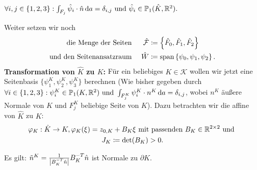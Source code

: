 \begin{remark}
 	$\forall i,j\in\{1,2,3\}: \int_{F_j} \hat{\psi}_i \cdot \hat{n} \mathop{}\!\mathrm{d} a = \delta_{i,j} \text{ und } \hat{\psi}_i \in \mathbb{P}_1(\hat{K}, \mathbb{R}^2).$
\end{remark}

Weiter setzen wir noch 
\begin{align*}
\text{ die Menge der Seiten }&& \hat{\mathcal{F}} &\coloneqq \left\{ \hat{F}_0, \hat{F}_1, \hat{F}_2 \right\} \\
\text{und den Seitenansatzraum }&&  \hat{W} &\coloneqq \operatorname{span} \left\{ \psi_0,\psi_1, \psi_2 \right\}.
\end{align*}
\textbf{Transformation von $ \hat{K} $ zu $ K $:} Für ein beliebiges $ K \in \mathcal{K} $ wollen wir jetzt eine Seitenbasis $ \{ \psi_1^K, \psi_2^K, \psi_3^K \} $ berechnen (Wie bisher gegeben durch $ \forall i\in\{1,2,3\}: \psi_i^K\in\mathbb{P}_1(K,\mathbb{R}^2) \text{ und } \int_{F_j^K} \psi_i^K \cdot n^K \mathop{}\!\mathrm{d} a = \delta_{i,j} $, wobei $ n^K $ äußere Normale von  $ K $ und $ F_j^K  $ beliebige Seite von $ K $). Dazu betrachten wir die affine  von $ \hat{K} $ zu $ K $:
\begin{gather*}
	\varphi_K: \hat{K} \to K, \varphi_K(\xi) = z_{0,K} + B_K \xi \text{ mit passenden } B_K\in\mathbb{R}^{2 \times 2} \text{ und } \\
	J_K \coloneqq \det(B_K) > 0.
\end{gather*}
\begin{Lemma}
	Es gilt: $\tilde{n}^K = \frac{1}{\abs{B_K^{-T} \hat{n}}} B_K^{-T} \hat{n} $ ist Normale zu $ \partial K $.
\end{Lemma}
\begin{remark}
\end{remark} 
